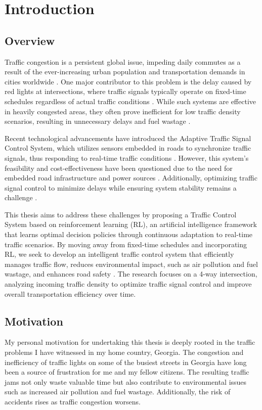 \chapter{Introduction}
\section{Overview}
Traffic congestion is a persistent global issue, impeding daily commutes as a result of the ever-increasing urban population and transportation demands in cities worldwide \cite{leveinson1998speed}\cite{tirachini2013estimation}. One major contributor to this problem is the delay caused by red lights at intersections, where traffic signals typically operate on fixed-time schedules regardless of actual traffic conditions \cite{mousavi2017traffic}. While such systems are effective in heavily congested areas, they often prove inefficient for low traffic density scenarios, resulting in unnecessary delays and fuel wastage \cite{mousavi2017traffic}.

Recent technological advancements have introduced the Adaptive Traffic Signal Control System, which utilizes sensors embedded in roads to synchronize traffic signals, thus responding to real-time traffic conditions \cite{leveinson1998speed}. However, this system's feasibility and cost-effectiveness have been questioned due to the need for embedded road infrastructure and power sources \cite{leveinson1998speed}. Additionally, optimizing traffic signal control to minimize delays while ensuring system stability remains a challenge \cite{mousavi2017traffic}.

This thesis aims to address these challenges by proposing a Traffic Control System based on reinforcement learning (RL), an artificial intelligence framework that learns optimal decision policies through continuous adaptation to real-time traffic scenarios. By moving away from fixed-time schedules and incorporating RL, we seek to develop an intelligent traffic control system that efficiently manages traffic flow, reduces environmental impact, such as air pollution and fuel wastage, and enhances road safety \cite{mousavi2017traffic}. The research focuses on a 4-way intersection, analyzing incoming traffic density to optimize traffic signal control and improve overall transportation efficiency over time.

\section{Motivation}
My personal motivation for undertaking this thesis is deeply rooted in the traffic problems I have witnessed in my home country, Georgia. The congestion and inefficiency of traffic lights on some of the busiest streets in Georgia have long been a source of frustration for me and my fellow citizens. The resulting traffic jams not only waste valuable time but also contribute to environmental issues such as increased air pollution and fuel wastage. Additionally, the risk of accidents rises as traffic congestion worsens.

